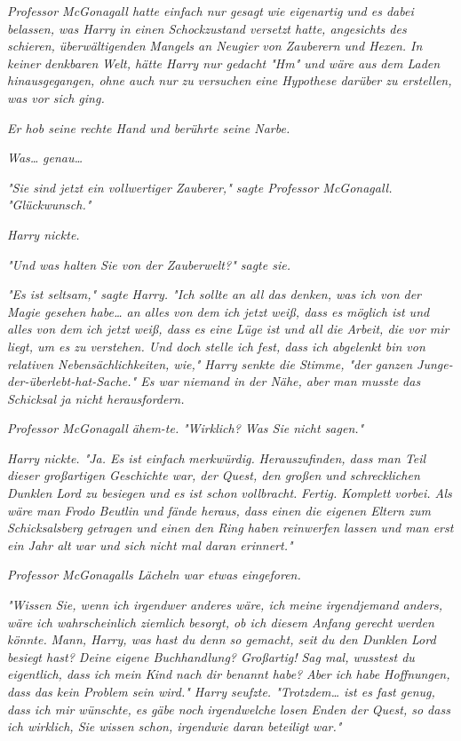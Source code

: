 {\emph{Professor McGonagall hatte einfach nur gesagt} \emph{\emph{wie eigenartig}} \emph{und es dabei belassen, was Harry in einen Schockzustand versetzt hatte, angesichts des schieren, überwältigenden} \emph{\emph{Mangels an Neugier}} \emph{von Zauberern und Hexen. In keiner} \emph{\emph{denkbaren}} \emph{Welt, hätte Harry nur gedacht "Hm" und wäre aus dem Laden hinausgegangen, ohne auch nur zu} \emph{\emph{versuchen}} \emph{eine Hypothese darüber zu erstellen, was vor sich ging.}

\emph{Er hob seine rechte Hand und berührte seine Narbe.}

\emph{Was…} \emph{\emph{genau…}}

\emph{"Sie sind jetzt ein vollwertiger Zauberer," sagte Professor McGonagall. "Glückwunsch."}

\emph{Harry nickte.}

\emph{"Und was halten Sie von der Zauberwelt?" sagte sie.}

\emph{"Es ist seltsam," sagte Harry. "Ich sollte an all das denken, was ich von der Magie gesehen habe… an alles von dem ich jetzt weiß, dass es möglich ist und alles von dem ich jetzt weiß, dass es eine Lüge ist und all die Arbeit, die vor mir liegt, um es zu verstehen. Und doch stelle ich fest, dass ich abgelenkt bin von relativen Nebensächlichkeiten, wie," Harry senkte die Stimme, "der ganzen Junge-der-überlebt-hat-Sache." Es war niemand in} \emph{der Nähe, aber man musste das Schicksal ja nicht herausfordern.}

\emph{Professor McGonagall} \emph{\emph{ähem-te.}} \emph{"Wirklich? Was Sie nicht sagen."}

\emph{Harry nickte. "Ja. Es ist einfach} \emph{\emph{merkwürdig.}} \emph{Herauszufinden, dass man Teil dieser großartigen Geschichte war, der Quest, den großen und schrecklichen Dunklen Lord zu besiegen und es ist schon} \emph{\emph{vollbracht.}} \emph{Fertig. Komplett vorbei. Als wäre man Frodo Beutlin und fände heraus, dass einen die eigenen Eltern zum Schicksalsberg getragen und einen den Ring haben reinwerfen lassen und man erst ein Jahr alt war und sich nicht mal daran erinnert."}

\emph{Professor McGonagalls Lächeln war etwas eingeforen.}

\emph{"Wissen Sie, wenn ich irgendwer anderes wäre, ich meine irgendjemand anders, wäre ich wahrscheinlich ziemlich besorgt, ob ich diesem Anfang gerecht werden könnte.} \emph{\emph{Mann, Harry, was hast du denn so gemacht, seit du den Dunklen Lord besiegt hast? Deine eigene Buchhandlung? Großartig! Sag mal, wusstest du eigentlich, dass ich mein Kind nach dir benannt habe?}} \emph{Aber ich habe Hoffnungen, dass das kein Problem sein wird." Harry seufzte. "Trotzdem… ist es fast genug, dass ich mir wünschte, es gäbe noch} \emph{\emph{irgendwelche}} \emph{losen Enden der Quest, so dass ich wirklich, Sie wissen schon, irgendwie daran} \emph{\emph{beteiligt}} \emph{war."}

}
